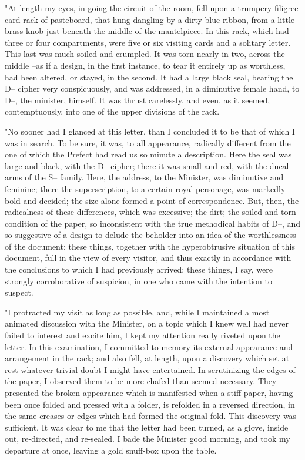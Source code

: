 \documentclass{article}
\begin{document}
"At length my eyes, in going the circuit of the room, fell upon a trumpery filigree card-rack of pasteboard, that hung dangling by a dirty blue ribbon, from a little brass knob just beneath the middle of the mantelpiece. In this rack, which had three or four compartments, were five or six visiting cards and a solitary letter. This last was much soiled and crumpled. It was torn nearly in two, across the middle --as if a design, in the first instance, to tear it entirely up as worthless, had been altered, or stayed, in the second. It had a large black seal, bearing the D-- cipher very conspicuously, and was addressed, in a diminutive female hand, to D--, the minister, himself. It was thrust carelessly, and even, as it seemed, contemptuously, into one of the upper divisions of the rack.

"No sooner had I glanced at this letter, than I concluded it to be that of which I was in search. To be sure, it was, to all appearance, radically different from the one of which the Prefect had read us so minute a description. Here the seal was large and black, with the D-- cipher; there it was small and red, with the ducal arms of the S-- family. Here, the address, to the Minister, was diminutive and feminine; there the superscription, to a certain royal personage, was markedly bold and decided; the size alone formed a point of correspondence. But, then, the radicalness of these differences, which was excessive; the dirt; the soiled and torn condition of the paper, so inconsistent with the true methodical habits of D--, and so suggestive of a design to delude the beholder into an idea of the worthlessness of the document; these things, together with the hyperobtrusive situation of this document, full in the view of every visitor, and thus exactly in accordance with the conclusions to which I had previously arrived; these things, I say, were strongly corroborative of suspicion, in one who came with the intention to suspect.

"I protracted my visit as long as possible, and, while I maintained a most animated discussion with the Minister, on a topic which I knew well had never failed to interest and excite him, I kept my attention really riveted upon the letter. In this examination, I committed to memory its external appearance and arrangement in the rack; and also fell, at length, upon a discovery which set at rest whatever trivial doubt I might have entertained. In scrutinizing the edges of the paper, I observed them to be more chafed than seemed necessary. They presented the broken appearance which is manifested when a stiff paper, having been once folded and pressed with a folder, is refolded in a reversed direction, in the same creases or edges which had formed the original fold. This discovery was sufficient. It was clear to me that the letter had been turned, as a glove, inside out, re-directed, and re-sealed. I bade the Minister good morning, and took my departure at once, leaving a gold snuff-box upon the table.
\end{document}

